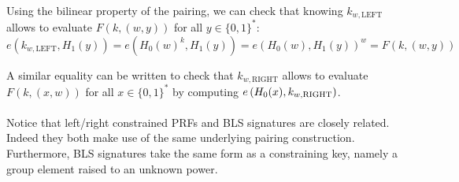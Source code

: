 Using the bilinear property of the pairing, we can check that knowing $k_{w,\mathrm{LEFT}}$ allows to evaluate $F(k, (w,y))$ for all $y \in \{0,1\}^*$:
\begin{equation}
	e(k_{w,\mathrm{LEFT}}, H_1(y)) = e(H_0(w)^k, H_1(y)) = e(H_0(w), H_1(y))^w = F(k, (w,y))
\end{equation}

\noindent A similar equality can be written to check that $k_{w,\mathrm{RIGHT}}$ allows to evaluate $F(k, (x,w))$ for all $x \in \{0,1\}^*$ by computing $e\left(H_0(x), k_{w,\mathrm{RIGHT}} \right)$.


\paragraph{} Notice that left/right constrained PRFs and BLS signatures are closely related. Indeed they both make use of the same underlying pairing construction. Furthermore, BLS signatures take the same form as a constraining key, namely a group element raised to an unknown power.









